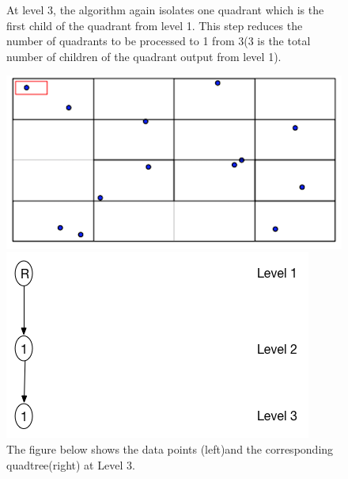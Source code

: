 \documentclass{article}
\begin{document}
\begin{figure}[H]
At level 3, the algorithm again isolates one quadrant which is the first child of the quadrant from level 1. 
This step reduces the number of quadrants to be processed to 1 from 3(3 is the total number of children of the quadrant output from level 1).

  \centering
  \begin{minipage}[b]{0.35\textwidth}
    \includegraphics[width=\textwidth]{1_1Quad1_3}  
  \end{minipage}
  \hfill
  \begin{minipage}[b]{0.5\textwidth}
    \includegraphics[width=\textwidth]{1Quad_3_tree}
  \end{minipage}
  \caption{The figure below shows the data points (left)and the corresponding quadtree(right) at Level 3.}
\end{figure}

\vspace{2cm}
\end{document}
